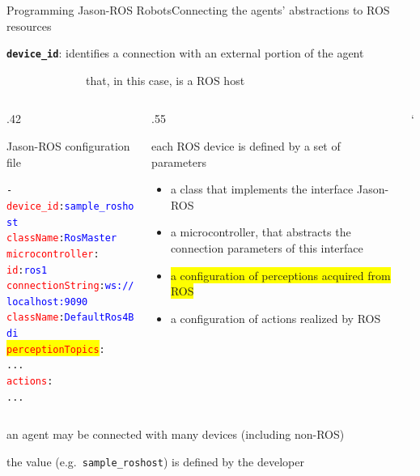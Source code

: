 \documentclass[compress]{beamer}
\newcommand{\yamlkey}[1]{\textcolor{red}{\texttt{#1}}}
\newcommand{\yamlvalue}[1]{\textcolor{blue}{\texttt{#1}}}
\begin{document}
\begin{frame}[fragile]{Programming Jason-ROS Robots}{Connecting the agents' abstractions to ROS resources}

    \footnotesize
    \texttt{{\bf device\_id}}: identifies a connection with an external portion of the agent\\ 
    
    \vspace{-.5cm}
    
    \ \ \ \ \ \ \ \ \ \ \ \ \ \ {\tiny that, in this case, is a ROS host}

    
    \begin{columns}
       \begin{column}{.42\textwidth}      
            \begin{block}{{\scriptsize Jason-ROS configuration file}}
                \scriptsize
                \begin{alltt} \tiny
- \yamlkey{device\_id}: \yamlvalue{sample\_roshost}
  \yamlkey{className}: \yamlvalue{RosMaster}
  \yamlkey{microcontroller}: 
    \yamlkey{id}: \yamlvalue{ros1} 
    \yamlkey{connectionString}: \yamlvalue{ws://localhost:9090} 
    \yamlkey{className}: \yamlvalue{DefaultRos4Bdi}
  \colorbox{yellow}{\yamlkey{perceptionTopics}}:         
    ...
  \yamlkey{actions}:       
    ...
                \end{alltt}

            \end{block}    
        \end{column}
        
        \hspace{-25pt} %
  
        \begin{column}{.55\textwidth} \scriptsize
  
            each ROS device is defined by a set of parameters
            \begin{itemize}\tiny
                \item a class that implements the interface Jason-ROS
                \item a microcontroller, that abstracts the connection parameters of this interface
                \item\colorbox{yellow}{a configuration of perceptions acquired from ROS}
                \item a configuration of actions realized by ROS
            \end{itemize}
        \end{column}`      
    \end{columns}
  
  
    \vspace{.3cm}
  
    an agent may be connected with many devices {\tiny (including non-ROS)}\\ \vspace{-.2cm}
  
    the value (e.g.~\texttt{sample\_roshost}) is defined by the developer
    
\end{frame}
\end{document}
